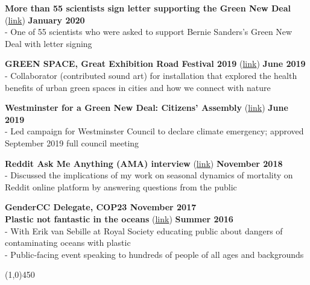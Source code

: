 \noindent \textbf{More than 55 scientists sign letter supporting the Green New Deal}  (\href{https://bit.ly/2uiY1Qz}{link}) \hfill \textbf{January 2020}\\
\noindent - One of 55 scientists who were asked to support Bernie Sanders's Green New Deal with letter signing \medskip

\noindent \textbf{GREEN SPACE, Great Exhibition Road Festival 2019} (\href{https://bit.ly/3vMnnk5}{link}) \hfill \textbf{June 2019}\\
\noindent - Collaborator (contributed sound art) for installation that explored the health benefits of urban green spaces in cities and how we connect with nature \medskip

\noindent \textbf{Westminster for a Green New Deal: Citizens' Assembly} 
(\href{https://bit.ly/2HjBxFi}{link}) \hfill \textbf{June 2019}\\
- Led campaign for Westminster Council to declare climate emergency;  approved September 2019 full council meeting \medskip

\noindent \textbf{Reddit Ask Me Anything (AMA) interview} (\href{https://bit.ly/2Qcbu5E}{link}) \hfill \textbf{November 2018}	\\
\noindent - Discussed  the implications of my work on seasonal dynamics of mortality on Reddit online platform by answering questions from the public \medskip

\noindent \textbf{GenderCC Delegate, COP23 \hfill November 2017}	\\

\noindent \textbf{Plastic not fantastic in the oceans} (\href{https://bit.ly/2B3us5l}{link}) \hfill \textbf{Summer 2016}							\\
- With Erik van Sebille at Royal Society educating public about dangers of contaminating oceans with plastic\\
- Public-facing event speaking to hundreds of people of all ages and backgrounds

\begin{center} \line(1,0){450} \end{center}